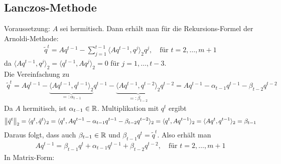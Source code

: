 \subsection{Lanczos-Methode}
Voraussetzung: $A$ sei hermitisch. Dann erhält man für die Rekursions-Formel der Arnoldi-Methode:
\begin{align*}
  \tilde{q}^t = Aq^{t-1} - \sum_{j=1}^{t-1} \langle Aq^{t-1}, q^j\rangle_2 q^j, \quad \text{für } t=2,\dots,m+1
\end{align*}
da $\langle Aq^{t-1}, q^j\rangle_2 = \langle q^{t-1}, Aq^j\rangle_2 = 0$ für $j=1,\dots,t-3$. \\
Die Vereinfachung zu 
\begin{align*}\tilde{q}^t = Aq^{t-1} - \underbrace{\langle Aq^{t-1}, q^{t-1}\rangle_2}_{=:\alpha_{t-1}} q^{t-1}
- \underbrace{\langle Aq^{t-1}, q^{t-2}\rangle_2}_{=:\beta_{t-2}} q^{t-2} = Aq^{t-1}-\alpha_{t-1}q^{t-1}-\beta_{t-2}q^{t-2}\end{align*}
Da $A$ hermitisch, ist $\alpha_{t-1}\in\mathbb R$. Multiplikation mit $q^t$ ergibt
\begin{align*}
  \vertn{2}{\tilde{q}^t}_2 = \langle q^t, \tilde{q}^t\rangle_2 = \langle q^t, Aq^{t-1}-\alpha_{t-1}q^{t-1}-\beta_{t-2}q^{t-2}\rangle_2 
  = \langle q^t, Aq^{t-1}\rangle_2 = \langle Aq^t, q^{t-1}\rangle_2 = \beta_{t-1}
\end{align*}
Daraus folgt, dass auch $\beta_{t-1}\in\mathbb R$ und $\beta_{t-1}q^t = \tilde{q}^t$. Also erhält man 
\begin{align*}
  Aq^{t-1} = \beta_{t-1}q^t + \alpha_{t-1}q^{t-1} + \beta_{t-2}q^{t-2},\quad\text{für } t=2,\dots,m+1
\end{align*}
In Matrix-Form:

